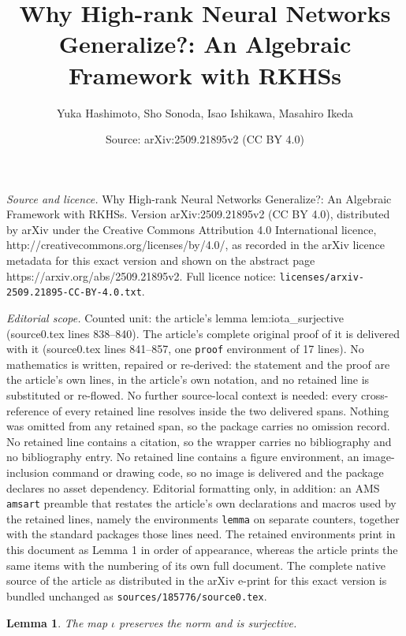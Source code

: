 \documentclass[10pt,a4paper]{amsart}
\title{Why High-rank Neural Networks Generalize?: An Algebraic Framework with RKHSs}
\author{Yuka Hashimoto, Sho Sonoda, Isao Ishikawa, Masahiro Ikeda}
\date{Source: arXiv:2509.21895v2 (CC BY 4.0)}
\newtheorem{lemma}{Lemma}
\begin{document}
\maketitle

\noindent\emph{Source and licence.} Why High-rank Neural Networks Generalize?: An Algebraic Framework with RKHSs. Version arXiv:2509.21895v2 (CC BY 4.0), distributed by arXiv under the Creative Commons Attribution 4.0 International licence, http://creativecommons.org/licenses/by/4.0/, as recorded in the arXiv licence metadata for this exact version and shown on the abstract page https://arxiv.org/abs/2509.21895v2. Full licence notice: \texttt{licenses/arxiv-2509.21895-CC-BY-4.0.txt}.\par\smallskip

\noindent\textit{Editorial scope.} Counted unit: the article's lemma lem:iota\_surjective (source0.tex lines 838--840). The article's complete original proof of it is delivered with it (source0.tex lines 841--857, one \texttt{proof} environment of 17 lines). No mathematics is written, repaired or re-derived: the statement and the proof are the article's own lines, in the article's own notation, and no retained line is substituted or re-flowed.  No further source-local context is needed: every cross-reference of every retained line resolves inside the two delivered spans.  Nothing was omitted from any retained span, so the package carries no omission record.  No retained line contains a citation, so the wrapper carries no bibliography and no bibliography entry.  No retained line contains a figure environment, an image-inclusion command or drawing code, so no image is delivered and the package declares no asset dependency.  Editorial formatting only, in addition: an AMS \texttt{amsart} preamble that restates the article's own declarations and macros used by the retained lines, namely the environments \texttt{lemma} on separate counters, together with the standard packages those lines need.  The retained environments print in this document as Lemma 1 in order of appearance, whereas the article prints the same items with the numbering of its own full document.  The complete native source of the article as distributed in the arXiv e-print for this exact version is bundled unchanged as \texttt{sources/185776/source0.tex}.
\begin{lemma}\label{lem:iota_surjective}
The map $\iota$ preserves the norm and is surjective.
\end{lemma}
\end{document}
